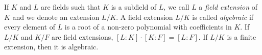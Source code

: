  If $K$ and $L$ are fields such that $K$ is a subfield of $L$, we call $L$ a \emph{field extension} of $K$ and we denote an extension $L/K$. A field extension $L/K$ is called \emph{algebraic} if every element of $L$ is a root of a non-zero polynomial with coefficients in $K$.
 If $L/K$ and $K/F$ are field extensions, $[L:K]\cdot[K:F] = [L:F]$.
 If $L/K$ is a finite extension, then it is algebraic.